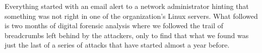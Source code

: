 \def\abstracttitle{Linux servers under siege: a real case forensic analysis of a cryptocurrency miner attack}
\def\abstractcomment{Regular Talk}
\def\abstractowner{Veronica Valeros}

\thispagestyle{abstract}

Everything started with an email alert to a network administrator hinting that something was not right in one of the organization's Linux servers. What followed is two months of digital forensic analysis where we followed the trail of breadcrumbs left behind by the attackers, only to find that what we found was just the last of a series of attacks that have started almost a year before.
